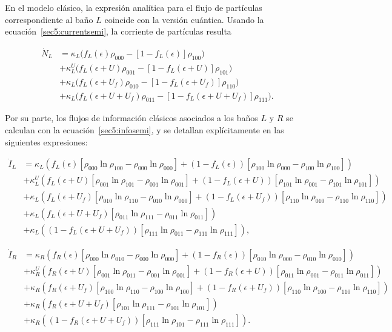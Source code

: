 En el modelo clásico, la expresión analítica para el flujo de partículas correspondiente al baño $L$ coincide con la versión cuántica. Usando la ecuación~\eqref{sec5:currentsemi}, la corriente de partículas resulta

\begin{align*}
    \dot{N}_{L} & = \kappa_{L}\big(f_{L}(\epsilon)\rho_{000} - [1-f_{L}(\epsilon)]\rho_{100} \big) \\
        & + \kappa^{U}_{L} \big(f_{L}(\epsilon+U)\rho_{001} - [1-f_{L}(\epsilon+U)]\rho_{101} \big)  \\
        & + \kappa_{L} \big(f_{L}(\epsilon+U_{f})\rho_{010} - [1-f_{L}(\epsilon+U_{f})]\rho_{110} \big)  \\  
        & + \kappa_{L} \big(f_{L}(\epsilon+U + U_{f})\rho_{011} - [1-f_{L}(\epsilon+U+U_{f})]\rho_{111} \big).
\end{align*}

Por su parte, los flujos de información clásicos asociados a los baños $L$ y $R$ se calculan con la ecuación~\eqref{sec5:infosemi}, y se detallan explícitamente en las siguientes expresiones:

\begin{align*} \dot{I}_{L} & = \kappa_{L}(f_{L}(\epsilon)[\rho_{000}\ln \rho_{100} - \rho_{000}\ln \rho_{000}] + (1-f_{L}(\epsilon))[\rho_{100}\ln \rho_{000} - \rho_{100}\ln \rho_{100} ] ) \\ & + \kappa^{U}_{L}(f_{L}(\epsilon + U)[\rho_{001}\ln \rho_{101} - \rho_{001}\ln \rho_{001}] + (1-f_{L}(\epsilon + U))[\rho_{101}\ln \rho_{001} -\rho_{101}\ln \rho_{101} ] ) \\ & + \kappa_{L}( f_{L}(\epsilon + U_{f})[\rho_{010}\ln \rho_{110} -\rho_{010}\ln \rho_{010} ] + (1-f_{L}(\epsilon + U_{f}))[\rho_{110}\ln \rho_{010} - \rho_{110}\ln \rho_{110} ] ) \\ & + \kappa_{L}( f_{L}(\epsilon + U + U_{f})[\rho_{011}\ln \rho_{111}- \rho_{011}\ln \rho_{011}]) \\ & + \kappa_{L}( (1-f_{L}(\epsilon+U+U_{f}) )[\rho_{111}\ln \rho_{011} - \rho_{111}\ln \rho_{111}]), \end{align*} 

\begin{align*} \dot{I}_{R} & = \kappa_{R}(f_{R}(\epsilon)[\rho_{000}\ln \rho_{010} - \rho_{000}\ln \rho_{000}] + (1-f_{R}(\epsilon))[\rho_{010}\ln \rho_{000} - \rho_{010}\ln \rho_{010} ] ) \\ & + \kappa^{U}_{R}(f_{R}(\epsilon + U)[\rho_{001}\ln \rho_{011} - \rho_{001}\ln \rho_{001}] + (1-f_{R}(\epsilon + U))[\rho_{011}\ln \rho_{001} -\rho_{011}\ln \rho_{011} ] ) \\ & + \kappa_{R}( f_{R}(\epsilon + U_{f})[\rho_{100}\ln \rho_{110} - \rho_{100}\ln \rho_{100} ] + (1-f_{R}(\epsilon + U_{f}))[\rho_{110}\ln \rho_{100} - \rho_{110}\ln \rho_{110} ] ) \\ & + \kappa_{R}( f_{R}(\epsilon + U + U_{f})[\rho_{101}\ln \rho_{111}- \rho_{101}\ln \rho_{101}]) \\ & + \kappa_{R}( (1-f_{R}(\epsilon+U+U_{f}) )[\rho_{111}\ln \rho_{101} - \rho_{111}\ln \rho_{111}]). \end{align*}


